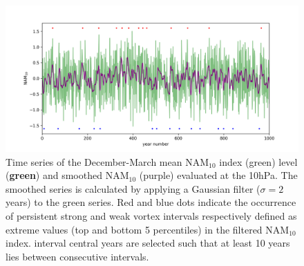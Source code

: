 \begin{figure}[h!]
\begin{center}
\noindent\includegraphics[width = \linewidth]{Figures/Figures-surface/NAM_and_filtered.png} 
\caption{Time series of the December-March mean NAM$_{10}$ index (green) level (\textbf{green}) and smoothed NAM$_{10}$ (purple) evaluated at the 10hPa. The smoothed series is calculated by applying a Gaussian filter ($\sigma = 2$ years) to the green series. Red and blue dots indicate the occurrence of persistent strong and weak vortex intervals respectively defined as extreme values (top and bottom 5 percentiles) in the filtered NAM$_{10}$ index. interval central years are selected such that at least 10 years lies between consecutive intervals.}
\label{NAM_and_filtered}
\end{center}
\end{figure}

